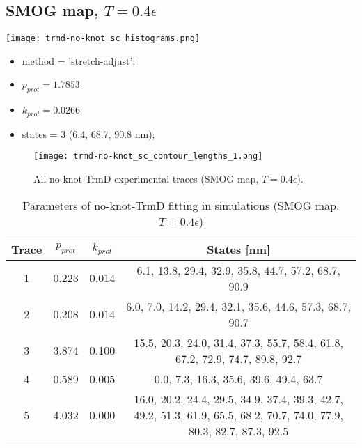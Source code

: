 \subsection{SMOG map, $T=0.4\epsilon$}
\label{subsec:no-knot-trmd-sc}
\begin{minipage}[c]{0.7\textwidth}
    \texttt{[image: trmd-no-knot\_sc\_histograms.png]}
\end{minipage}
\hfill
\begin{minipage}[c]{0.45\textwidth}
    \begin{itemize}
        \item method = 'stretch-adjust';
        \item $p_{prot}=1.7853$
        \item $k_{prot}=0.0266$
        \item states = 3 (6.4, 68.7, 90.8 nm);
    \end{itemize}
\end{minipage}

\begin{figure}
    \centering
    \texttt{[image: trmd-no-knot\_sc\_contour\_lengths\_1.png]}
    \caption{All no-knot-TrmD experimental traces (SMOG map, $T=0.4\epsilon$).}
    \label{fig:no-knot-trmd-sc-cl1}
\end{figure}

\begin{table}
    \tiny
    \centering
    \caption{Parameters of no-knot-TrmD fitting in simulations (SMOG map, $T=0.4\epsilon$)}
    \label{tab:no-knot-trmd-sc-parameters}
    \begin{tabular}{c|c|c|c}
        \textbf{Trace} & \textbf{$p_{prot}$} & \textbf{$k_{prot}$} & \textbf{States [nm]}\\\hline
        1 & 0.223 & 0.014 & 6.1, 13.8, 29.4, 32.9, 35.8, 44.7, 57.2, 68.7, 90.9\\
        2 & 0.208 & 0.014 & 6.0, 7.0, 14.2, 29.4, 32.1, 35.6, 44.6, 57.3, 68.7, 90.7\\
        3 & 3.874 & 0.100 & 15.5, 20.3, 24.0, 31.4, 37.3, 55.7, 58.4, 61.8, 67.2, 72.9, 74.7, 89.8, 92.7\\
        4 & 0.589 & 0.005 & 0.0, 7.3, 16.3, 35.6, 39.6, 49.4, 63.7\\
        5 & 4.032 & 0.000 & 16.0, 20.2, 24.4, 29.5, 34.9, 37.4, 39.3, 42.7, 49.2, 51.3, 61.9, 65.5, 68.2, 70.7, 74.0, 77.9, 80.3, 82.7, 87.3, 92.5\\
    \end{tabular}
\end{table}

